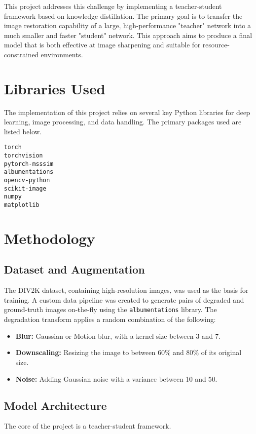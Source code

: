 \documentclass[12pt,a4paper]{article}
\begin{document}
This project addresses this challenge by implementing a teacher-student framework based on knowledge distillation. The primary goal is to transfer the image restoration capability of a large, high-performance "teacher" network into a much smaller and faster "student" network. This approach aims to produce a final model that is both effective at image sharpening and suitable for resource-constrained environments.

\section{Libraries Used}
The implementation of this project relies on several key Python libraries for deep learning, image processing, and data handling. The primary packages used are listed below.
\begin{verbatim}
torch
torchvision
pytorch-msssim
albumentations
opencv-python
scikit-image
numpy
matplotlib
\end{verbatim}

\newpage
\section{Methodology}

\subsection{Dataset and Augmentation}
The DIV2K dataset, containing high-resolution images, was used as the basis for training. A custom data pipeline was created to generate pairs of degraded and ground-truth images on-the-fly using the \texttt{albumentations} library. The degradation transform applies a random combination of the following:
\begin{itemize}
    \item \textbf{Blur:} Gaussian or Motion blur, with a kernel size between 3 and 7.
    \item \textbf{Downscaling:} Resizing the image to between 60\% and 80\% of its original size.
    \item \textbf{Noise:} Adding Gaussian noise with a variance between 10 and 50.
\end{itemize}

\subsection{Model Architecture}
The core of the project is a teacher-student framework.
\end{document}
